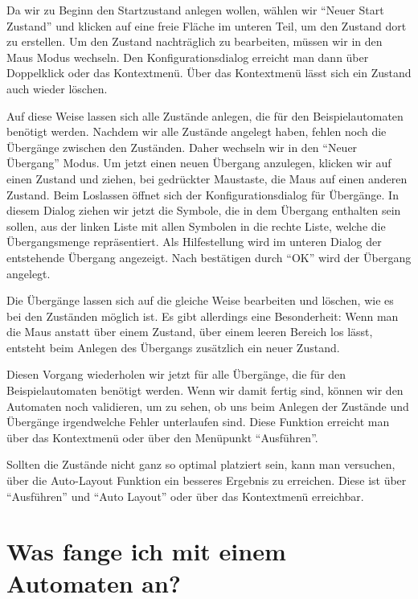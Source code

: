 Da wir zu Beginn den Startzustand anlegen wollen, wählen wir "`Neuer Start
Zustand"' und klicken auf eine freie Fläche im unteren Teil, um den Zustand dort
zu erstellen. Um den Zustand nachträglich zu bearbeiten, müssen wir in den Maus
Modus wechseln. Den Konfigurationsdialog erreicht man dann über Doppelklick oder
das Kontextmenü. Über das Kontextmenü lässt sich ein Zustand auch wieder
löschen.\vspace{10pt}

Auf diese Weise lassen sich alle Zustände anlegen, die für den Beispielautomaten
benötigt werden. Nachdem wir alle Zustände angelegt haben, fehlen noch die
Übergänge zwischen den Zuständen. Daher wechseln wir in den "`Neuer Übergang"'
Modus. Um jetzt einen neuen Übergang anzulegen, klicken wir auf einen Zustand und
ziehen, bei gedrückter Maustaste, die Maus auf einen anderen Zustand. Beim
Loslassen öffnet sich der Konfigurationsdialog für Übergänge. In diesem Dialog
ziehen wir jetzt die Symbole, die in dem Übergang enthalten sein sollen, aus der
linken Liste mit allen Symbolen in die rechte Liste, welche die Übergangsmenge
repräsentiert. Als Hilfestellung wird im unteren Dia\-log der entstehende
Übergang angezeigt. Nach bestätigen durch "`OK"' wird der Übergang
angelegt.\vspace{10pt}

Die Übergänge lassen sich auf die gleiche Weise bearbeiten und löschen, wie es
bei den Zuständen möglich ist. Es gibt allerdings eine Besonderheit: Wenn man die
Maus anstatt über einem Zustand, über einem leeren Bereich los lässt, entsteht
beim Anlegen des Übergangs zusätzlich ein neuer Zustand.\vspace{10pt}

Diesen Vorgang wiederholen wir jetzt für alle Übergänge, die
für den Beispielautomaten benötigt werden. Wenn wir damit fertig sind, können
wir den Automaten noch validieren, um zu sehen, ob uns beim Anlegen der Zustände
und Übergänge irgendwelche Fehler unterlaufen sind. Diese Funktion erreicht man
über das Kontextmenü oder über den Menüpunkt "`Ausführen"'.\vspace{10pt}

Sollten die Zustände nicht ganz so optimal platziert sein, kann man
versuchen, über die Auto-Layout Funktion ein besseres Ergebnis zu
erreichen. Diese ist über "`Ausführen"' und "`Auto Layout"' oder über
das Kontextmenü erreichbar.

\section{Was fange ich mit einem Automaten an?}

